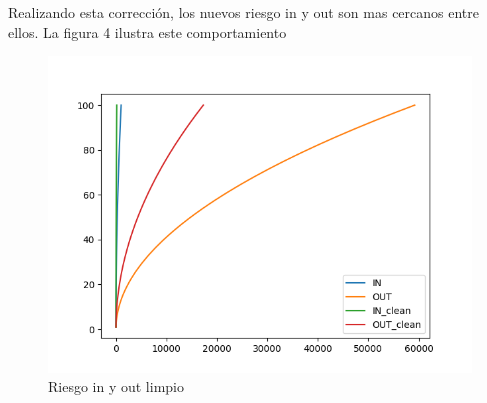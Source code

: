 \documentclass[paper=letter, fontsize=14pt]{scrartcl}
\numberwithin{equation}{section} %
\numberwithin{figure}{section} %
\numberwithin{table}{section} %
\begin{document}
Realizando esta corrección, los nuevos riesgo in y out son mas cercanos entre ellos. La figura 4 ilustra este comportamiento

\begin{figure}[h]
\centering
\includegraphics[scale=.75]{i4.png}
\caption{Riesgo in y out limpio} 
\end{figure}
\pagebreak
\end{document}
